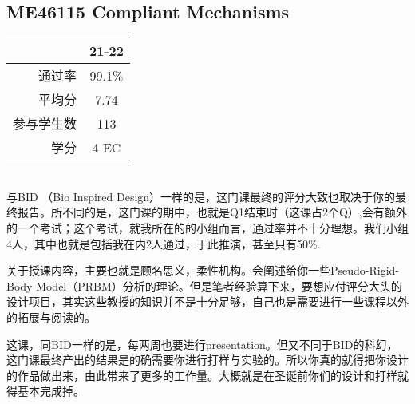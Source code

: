 \subsection{ME46115 Compliant Mechanisms}
\begin{minipage}{0.45\textwidth}
\centering
{}
\end{minipage}%
\begin{minipage}{0.45\textwidth}
\raggedleft
\begin{tabular}{r|c}
\textbf{ } & \textbf{21-22} \\ \hline
通过率 & 99.1\%\\ 
平均分 & 7.74 \\ 
参与学生数 & 113 \\ 
学分 & 4 EC\\
\end{tabular}
\end{minipage}\\

与BID （Bio Inspired Design）一样的是，这门课最终的评分大致也取决于你的最终报告。所不同的是，这门课的期中，也就是Q1结束时（这课占2个Q）,会有额外的一个考试；这个考试，就我所在的的小组而言，通过率并不十分理想。我们小组4人，其中也就是包括我在内2人通过，于此推演，甚至只有50\%.

关于授课内容，主要也就是顾名思义，柔性机构。会阐述给你一些Pseudo-Rigid-Body Model（PRBM）分析的理论。但是笔者经验算下来，要想应付评分大头的设计项目，其实这些教授的知识并不是十分足够，自己也是需要进行一些课程以外的拓展与阅读的。

这课，同BID一样的是，每两周也要进行presentation。但又不同于BID的科幻，这门课最终产出的结果是的确需要你进行打样与实验的。所以你真的就得把你设计的作品做出来，由此带来了更多的工作量。大概就是在圣诞前你们的设计和打样就得基本完成掉。

